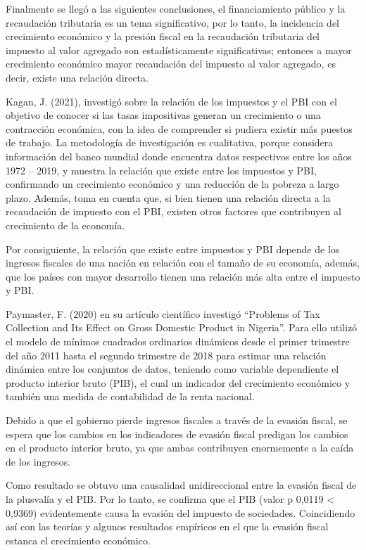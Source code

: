\documentclass[
  letterpaper,
]{article}
\begin{document}
Finalmente se llegó a las siguientes conclusiones, el financiamiento
público y la recaudación tributaria es un tema significativo, por lo
tanto, la incidencia del crecimiento económico y la presión fiscal en la
recaudación tributaria del impuesto al valor agregado son
estadísticamente significativas; entonces a mayor crecimiento económico
mayor recaudación del impuesto al valor agregado, es decir, existe una
relación directa.

Kagan, J. (2021), investigó sobre la relación de los impuestos y el PBI
con el objetivo de conocer si las tasas impositivas generan un
crecimiento o una contracción económica, con la idea de comprender si
pudiera existir más puestos de trabajo. La metodología de investigación
es cualitativa, porque considera información del banco mundial donde
encuentra datos respectivos entre los años 1972 -- 2019, y muestra la
relación que existe entre los impuestos y PBI, confirmando un
crecimiento económico y una reducción de la pobreza a largo plazo.
Además, toma en cuenta que, si bien tienen una relación directa a la
recaudación de impuesto con el PBI, existen otros factores que
contribuyen al crecimiento de la economía.

Por consiguiente, la relación que existe entre impuestos y PBI depende
de los ingresos fiscales de una nación en relación con el tamaño de su
economía, además, que los países con mayor desarrollo tienen una
relación más alta entre el impuesto y PBI.

Paymaster, F. (2020) en su artículo científico investigó ``Problems of
Tax Collection and Its Effect on Gross Domestic Product in Nigeria''.
Para ello utilizó el modelo de mínimos cuadrados ordinarios dinámicos
desde el primer trimestre del año 2011 hasta el segundo trimestre de
2018 para estimar una relación dinámica entre los conjuntos de datos,
teniendo como variable dependiente el producto interior bruto (PIB), el
cual un indicador del crecimiento económico y también una medida de
contabilidad de la renta nacional.

Debido a que el gobierno pierde ingresos fiscales a través de la evasión
fiscal, se espera que los cambios en los indicadores de evasión fiscal
predigan los cambios en el producto interior bruto, ya que ambas
contribuyen enormemente a la caída de los ingresos.

Como resultado se obtuvo una causalidad unidireccional entre la evasión
fiscal de la plusvalía y el PIB. Por lo tanto, se confirma que el PIB
(valor p 0,0119 \textless{} 0,9369) evidentemente causa la evasión del
impuesto de sociedades. Coincidiendo así con las teorías y algunos
resultados empíricos en el que la evasión fiscal estanca el crecimiento
económico.
\end{document}
